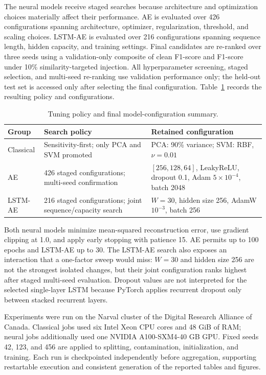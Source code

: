\documentclass[10pt,conference]{IEEEtran}
\begin{document}
The neural models receive staged searches because architecture and optimization choices materially affect their performance. AE is evaluated over 426 configurations spanning architecture, optimizer, regularization, threshold, and scaling choices. LSTM-AE is evaluated over 216 configurations spanning sequence length, hidden capacity, and training settings. Final candidates are re-ranked over three seeds using a validation-only composite of clean F1-score and F1-score under 10\% similarity-targeted injection. All hyperparameter screening, staged selection, and multi-seed re-ranking use validation performance only; the held-out test set is accessed only after selecting the final configuration. Table~\ref{tab:tuning_summary} records the resulting policy and configurations.

\begin{table}[t]
\caption{Tuning policy and final model-configuration summary.}
\label{tab:tuning_summary}
\centering
\scriptsize
\setlength{\tabcolsep}{3pt}
\begin{tabular}{|l|p{2.45cm}|p{3.55cm}|}
\hline
\textbf{Group} & \textbf{Search policy} & \textbf{Retained configuration} \\
\hline
Classical & Sensitivity-first; only PCA and SVM promoted & PCA: 90\% variance; SVM: RBF, $\nu=0.01$ \\
\hline
AE & 426 staged configurations; multi-seed confirmation & $[256,128,64]$, LeakyReLU, dropout 0.1, Adam $5\times10^{-4}$, batch 2048 \\
\hline
LSTM-AE & 216 staged configurations; joint sequence/capacity search & $W=30$, hidden size 256, AdamW $10^{-3}$, batch 256 \\
\hline
\end{tabular}
\end{table}

Both neural models minimize mean-squared reconstruction error, use gradient clipping at 1.0, and apply early stopping with patience 15. AE permits up to 100 epochs and LSTM-AE up to 30. The LSTM-AE search also exposes an interaction that a one-factor sweep would miss: $W=30$ and hidden size 256 are not the strongest isolated changes, but their joint configuration ranks highest after staged multi-seed evaluation. Dropout values are not interpreted for the selected single-layer LSTM because PyTorch applies recurrent dropout only between stacked recurrent layers.

Experiments were run on the Narval cluster of the Digital Research Alliance of Canada. Classical jobs used six Intel Xeon CPU cores and 48 GiB of RAM; neural jobs additionally used one NVIDIA A100-SXM4-40 GB GPU. Fixed seeds 42, 123, and 456 are applied to splitting, contamination, initialization, and training. Each run is checkpointed independently before aggregation, supporting restartable execution and consistent generation of the reported tables and figures.
\end{document}
